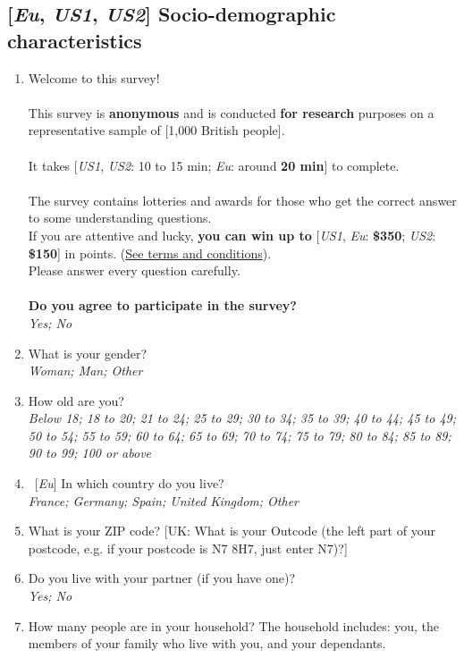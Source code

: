 \documentclass[12pt,english]{article}
\begin{document}
\subsection*{[\textit{Eu}, \textit{US1}, \textit{US2}] Socio-demographic characteristics}
\begin{enumerate}
\item Welcome to this survey!\\
\\
This survey is \textbf{anonymous} and is conducted \textbf{for research} purposes on a representative sample of [1,000 British people].\\
 \\
It takes [\textit{US1}, \textit{US2}: 10 to 15 min; \textit{Eu}: around \textbf{20 min}] to complete.  \\
 \\
The survey contains lotteries and awards for those who get the correct answer to some understanding questions.\\
If you are attentive and lucky, \textbf{you can win up to }[\textit{US1}, \textit{Eu}: \textbf{\$350}; \textit{US2}: \textbf{\$150}] in points. (\href{https://uvafeb.eu.qualtrics.com/WRQualtricsControlPanel/File.php?F=F_cBZAXTgNktGZbee&download=1}{See terms and conditions}).    \\
Please answer every question carefully.  \\
 \\
\textbf{Do you agree to participate in the survey?}
\\ \textit{Yes; No}
\item What is your gender?
\\ \textit{Woman; Man; Other}
\item How old are you?
\\ \textit{Below 18; 18 to 20; 21 to 24; 25 to 29; 30 to 34; 35 to 39; 40 to 44; 45 to 49; 50 to 54; 55 to 59; 60 to 64; 65 to 69; 70 to 74; 75 to 79; 80 to 84; 85 to 89; 90 to 99; 100 or above}
\item ~[\textit{Eu}] In which country do you live?
\\ \textit{France; Germany; Spain; United Kingdom; Other}
\item What is your ZIP code? [UK: What is your Outcode (the left part of your postcode, e.g. if your postcode is N7 8H7, just enter N7)?]
\item \label{q:partner} Do you live with your partner (if you have one)?
\\ \textit{Yes; No}
\item How many people are in your household? The household includes: you, the members of your family who live with you, and your dependants. %

\end{enumerate}
\end{document}

